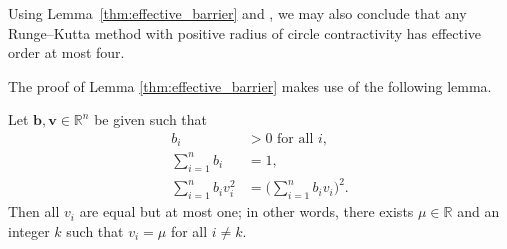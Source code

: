 \begin{remark}
	Using Lemma~\ref{thm:effective_barrier} and \cite[Theorem~4.1]{dahlquist2006}, 
  	we may also conclude that any Runge--Kutta method with positive radius of
  	circle contractivity has effective order at most four.
\end{remark}

The proof of Lemma \ref{thm:effective_barrier} makes use of the following 
lemma.
\begin{lemma}\label{Davids_lemma}
	Let $\bm{b},\bm{v} \in \mathbb{R}^{n}$ be given such that
    \begin{subequations}\label{eq:DavidsLemma}
    		\begin{align}
    			b_i & > 0 \mbox{ for all } i, \label{eq:DavidsLemma_a} \\
    			\sum_{i=1}^n b_i & = 1, \label{eq:DavidsLemma_b} \\
    			\sum_{i=1}^n b_i v_i^2 & = \biggl(\sum_{i=1}^n b_i v_i\biggr)^{\!\! 2}. \label{eq:DavidsLemma_c}
    		\end{align}
    	\end{subequations}
    	Then all $v_i$ are equal but at most one; in other words, there exists 
    	$\mu \in \mathbb{R}$ and an integer $k$ such that $v_i = \mu$ for 
    	all $i \ne k$.
\end{lemma}

